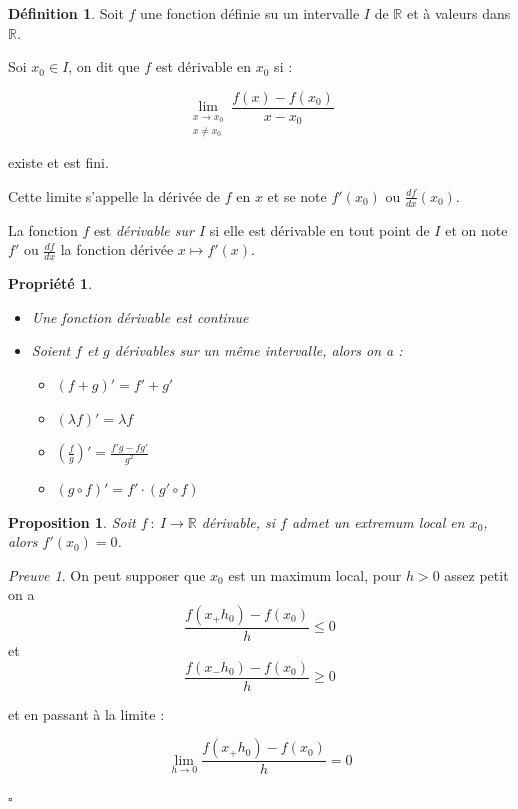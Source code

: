 \documentclass[]{article}
\newtheorem{myproposition}{Proposition}
\newtheorem{myproperty}{Propriété}
\theoremstyle{remark}
\newtheorem{myproof}{Preuve}
\theoremstyle{definition}
\newtheorem{mydef}{Définition}
\newcommand{\cqfd}{
	\hfill$\square$
}
\newcommand{\funcshort}[3]{
#1 ~ : ~ #2 \longrightarrow #3
}
\begin{document}
\begin{mydef}
	Soit $f$ une fonction définie su un intervalle $I$ de $\mathbb{R}$ et à valeurs dans $\mathbb{R}$.
	
	Soi $x_0 \in I$, on dit que $f$ est dérivable en $x_0$ si :
	
	$$\lim\limits_{\substack{x \to x_0 \\ x \neq x_0}} \frac{f(x) - f(x_0)}{x - x_0}$$
	
	existe et est fini.
	
	Cette limite s'appelle la dérivée de $f$ en $x$ et se note $f'(x_0)$ ou $\frac{df}{dx}(x_0)$.
	
	La fonction $f$ est \textit{dérivable sur $I$} si elle est dérivable en tout point de $I$ et on note $f'$ ou $\frac{df}{dx}$ la fonction dérivée $x \longmapsto f'(x)$.
\end{mydef}

\begin{myproperty}
	\begin{itemize}
		\item Une fonction dérivable est continue
		\item Soient $f$ et $g$ dérivables sur un même intervalle, alors on a :
		\begin{itemize}
			\item $(f+g)'=f'+g'$
			\item $(\lambda f)'=\lambda f$
			\item $(\frac{f}{g})'=\frac{f'g-fg'}{g^2}$
			\item $(g \circ f)'=f' \cdot (g' \circ f)$
		\end{itemize}
	\end{itemize}
\end{myproperty}

\begin{myproposition}
	Soit $\funcshort{f}{I}{\mathbb{R}}$ dérivable, si $f$ admet un extremum local en $x_0$, alors $f'(x_0) = 0$.
\end{myproposition}

\begin{myproof}
	On peut supposer que $x_0$ est un maximum local, pour $h > 0$ assez petit on a $$\frac{f(x_+h_0) - f(x_0)}{h} \leqslant 0$$
	et
	$$\frac{f(x_-h_0) - f(x_0)}{h} \geqslant 0$$
	
	et en passant à la limite :
	
	$$\lim\limits_{h \to 0} \frac{f(x_+h_0) - f(x_0)}{h} = 0$$
	
	\cqfd
\end{myproof}
\end{document}
